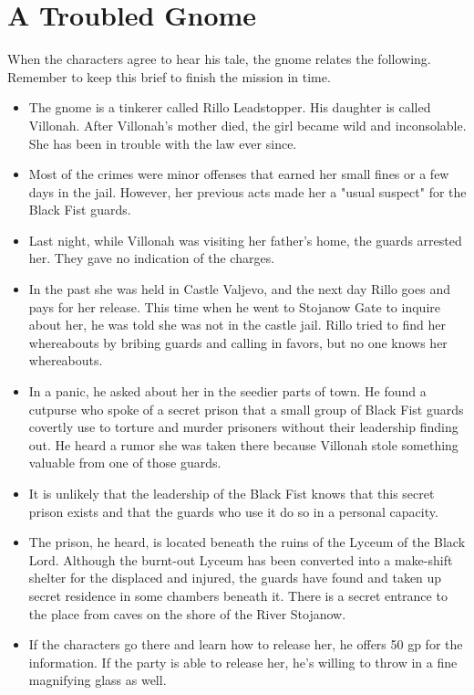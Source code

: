 \documentclass[10pt,a4paper,twoside,bg=print,twocolumn,openany,nodeprecatedcode]{dndbook}
\begin{document}
\section{A Troubled Gnome}
When the characters agree to hear his tale, the gnome relates the following. Remember to keep this brief to finish the mission in time.


\begin{itemize}
\item The gnome is a tinkerer called Rillo Leadstopper. His daughter is called Villonah. After Villonah's mother died, the girl became wild and inconsolable. She has been in trouble with the law ever since.
\item Most of the crimes were minor offenses that earned her small fines or a few days in the jail. However, her previous acts made her a "usual suspect" for the Black Fist guards.
\item Last night, while Villonah was visiting her father's home, the guards arrested her. They gave no indication of the charges.
\item In the past she was held in Castle Valjevo, and the next day Rillo goes and pays for her release. This time when he went to Stojanow Gate to inquire about her, he was told she was not in the castle jail. Rillo tried to find her whereabouts by bribing guards and calling in favors, but no one knows her whereabouts.
\item In a panic, he asked about her in the seedier parts of town. He found a cutpurse who spoke of a secret prison that a small group of Black Fist guards covertly use to torture and murder prisoners without their leadership finding out. He heard a rumor she was taken there because Villonah stole something valuable from one of those guards.
\item It is unlikely that the leadership of the Black Fist knows that this secret prison exists and that the guards who use it do so in a personal capacity.
\item The prison, he heard, is located beneath the ruins of the Lyceum of the Black Lord. Although the burnt-out Lyceum has been converted into a make-shift shelter for the displaced and injured, the guards have found and taken up secret residence in some chambers beneath it. There is a secret entrance to the place from caves on the shore of the River Stojanow.
\item If the characters go there and learn how to release her, he offers 50 gp for the information. If the party is able to release her, he's willing to throw in a fine magnifying glass as well.
\end{itemize}
\end{document}
